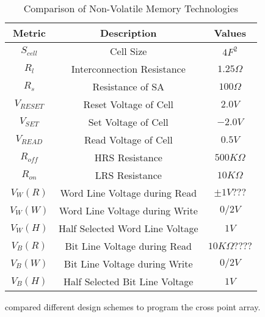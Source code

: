 \begin{table}[!b]
  \centering
  \scriptsize
    \scriptsize
  \caption{Comparison of Non-Volatile Memory Technologies}\label{table:parameter}
  \vspace{-5pt}
  \begin{tabular}{c|c|c}
    \hline    \hline
    \textbf{Metric} & \textbf{Description} & \textbf{Values} \\
    \hline
    \textbf{$S_{cell}$} & Cell Size & \textbf{$4F^2$} \\
    \textbf{$R_l$} &  Interconnection Resistance&\textbf{$1.25\Omega$} \\
    \textbf{$R_s$} &  Resistance of SA&\textbf{$100\Omega$} \\
    \textbf{$V_{RESET}$} & Reset Voltage of Cell&\textbf{$2.0V$} \\
    \textbf{$V_{SET}$} & Set Voltage of Cell&\textbf{$-2.0V$} \\
    \textbf{$V_{READ}$} & Read Voltage of Cell&\textbf{$0.5V$} \\
    \textbf{$R_{off}$} & HRS Resistance &\textbf{$500K\Omega$} \\
    \textbf{$R_{on}$} & LRS Resistance &\textbf{$10K\Omega$} \\
    \textbf{$V_{W}(R)$} & Word Line Voltage during Read &\textbf{$\pm 1V ???$} \\
    \textbf{$V_{W}(W)$} & Word Line Voltage during Write  &\textbf{$0 / 2V$} \\
    \textbf{$V_{W}(H)$} & Half Selected Word Line Voltage &\textbf{$1V$} \\
    \textbf{$V_{B}(R)$} & Bit Line Voltage during Read  &\textbf{$10K\Omega ????$} \\
    \textbf{$V_{B}(W)$} & Bit Line Voltage during Write  &\textbf{$0 / 2V$} \\
    \textbf{$V_{B}(H)$} & Half Selected Bit Line Voltage &\textbf{$1V$} \\

    \hline
  \end{tabular}
  \vspace{-10pt}
\end{table}
 


compared different design schemes to program the cross point array.
